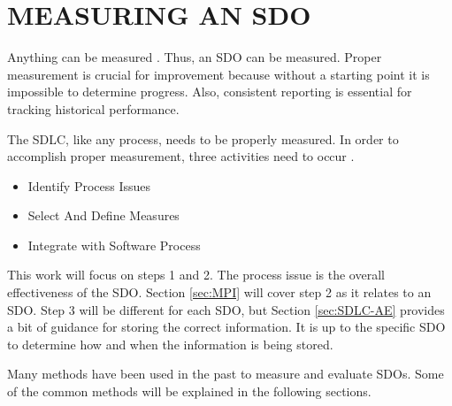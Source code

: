 \documentclass[SDSUThesis.tex]{subfiles}
\begin{document}
\section{MEASURING AN SDO}

    Anything can be measured \cite{Hubbard2010}.  Thus, an SDO can be 
    measured.  Proper measurement is crucial for improvement because
    without a starting point it is impossible to determine progress.
    Also, consistent reporting is essential for 
    tracking historical performance.  
    
    The SDLC, like any process, needs to be properly measured.  In
    order to accomplish proper measurement, three activities need
    to occur \cite{florac1999}.  
    
    \begin{itemize}
        \item Identify Process Issues
        \item Select And Define Measures
        \item Integrate with Software Process
    \end{itemize}
    
    This work will focus on steps 1 and 2.  The process issue is the overall
    effectiveness of the SDO.  Section \ref{sec:MPI} will cover step 2 as
    it relates to an SDO.  Step
    3 will be different for each SDO, but Section \ref{sec:SDLC-AE} provides
    a bit of guidance for storing the correct information.  It is up to the
    specific SDO to determine how and when the information is being stored.

    Many methods have been  used in the past 
    to measure and evaluate SDOs.  Some of the common methods
    will be explained in the following sections. 
\end{document}
